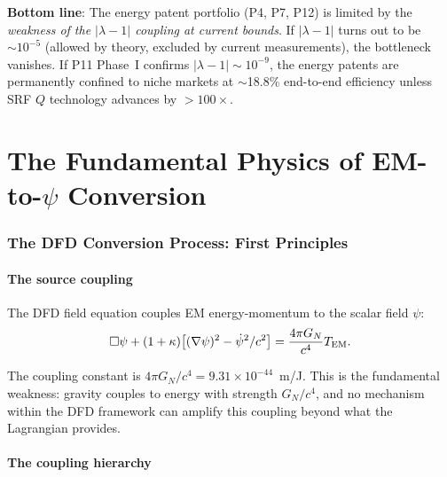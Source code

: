 \documentclass[11pt]{article}
\newcommand{\ee}[1]{\times 10^{#1}}
\newcommand{\lambdaone}{|\lambda{-}1|}
\newcommand{\GN}{G_N}
\begin{document}
\begin{tcolorbox}[colback=red!5!white, colframe=red!60!black,
  title=\textbf{W3i9 FINAL VERDICT: READ THIS FIRST}]
\medskip
\textbf{Bottom line}: The energy patent portfolio (P4, P7, P12) is
limited by the \emph{weakness of the $\lambdaone$ coupling at current
bounds}. If $\lambdaone$ turns out to be $\sim 10^{-5}$ (allowed by
theory, excluded by current measurements), the bottleneck vanishes.
If P11 Phase~I confirms $\lambdaone \sim 10^{-9}$, the energy patents
are permanently confined to niche markets at $\sim$18.8\% end-to-end
efficiency unless SRF $Q$ technology advances by $>100\times$.
\end{tcolorbox}

\part{The Fundamental Physics of EM-to-$\psi$ Conversion}
\label{part:fundamental}

\section{The DFD Conversion Process: First Principles}
\label{sec:first-principles}

\subsection{The source coupling}

The DFD field equation couples EM energy-momentum to the scalar field
$\psi$:
\begin{equation}
\Box\psi + (1+\kappa)\bigl[(\nabla\psi)^2 - \dot\psi^2/c^2\bigr]
= \frac{4\pi\GN}{c^4}T_{\rm EM}.
\label{eq:DFD-field}
\end{equation}

The coupling constant is $4\pi\GN/c^4 = 9.31\ee{-44}$~m/J. This is the
fundamental weakness: gravity couples to energy with strength $\GN/c^4$,
and no mechanism within the DFD framework can amplify this coupling
beyond what the Lagrangian provides.

\subsection{The coupling hierarchy}
\end{document}
